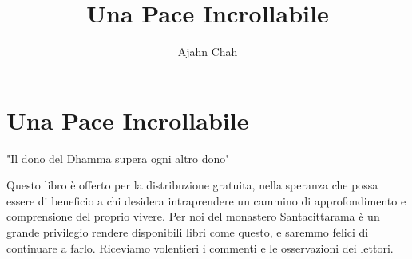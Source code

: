 \documentclass[11pt,twoside,final]{memoir}
\title{Una Pace Incrollabile}
\subtitle{}
\author{Ajahn Chah}
\date{}
\begin{document}
\emptysheet


\frontmatter*


\cleartoverso
\thispagestyle{empty}



\cleartorecto
\thispagestyle{empty}



\cleartoverso
\thispagestyle{empty}



\cleartorecto
\thispagestyle{empty}



\cleartorecto
\tableofcontents*

\mainmatter*

\book{\thetitle}

\setcounter{chapter}{0}


\chapter{Una Pace Incrollabile}



\backmatter



\printpagenotes

"Il dono del Dhamma supera ogni altro dono"

Questo libro è offerto per la distribuzione gratuita, nella speranza che
possa essere di beneficio a chi desidera intraprendere un cammino di
approfondimento e comprensione del proprio vivere. Per noi del monastero
Santacittarama è un grande privilegio rendere disponibili libri come
questo, e saremmo felici di continuare a farlo. Riceviamo volentieri i
commenti e le osservazioni dei lettori.
\end{document}

